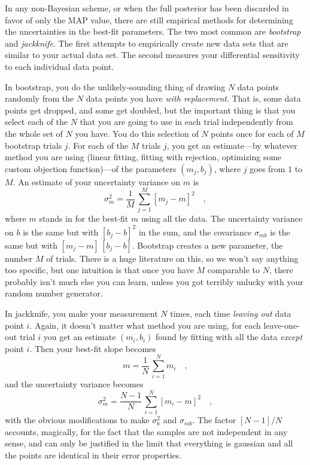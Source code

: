 \documentclass[12pt]{article}
\begin{document}
In any non-Bayesian scheme, or when the full posterior has been
discarded in favor of only the MAP value, there are still empirical
methods for determining the uncertainties in the best-fit parameters.
The two most common are \emph{bootstrap} and \emph{jackknife}.  The
first attempts to empirically create new data sets that are similar to
your actual data set.  The second measures your differential
sensitivity to each individual data point.

In bootstrap, you do the unlikely-sounding thing of drawing $N$ data
points randomly from the $N$ data points you have \emph{with
  replacement}.  That is, some data points get dropped, and some get
doubled, but the important thing is that you select each of the $N$
that you are going to use in each trial independently from the whole
set of $N$ you have.  You do this selection of $N$ points once for
each of $M$ bootstrap trials $j$.  For each of the $M$ trials $j$, you
get an estimate---by whatever method you are using (linear fitting,
fitting with rejection, optimizing some custom objection
function)---of the parameters $(m_j,b_j)$, where $j$ goes from $1$ to
$M$.  An estimate of your uncertainty variance on $m$ is
\begin{equation}
\sigma_m^2 = \frac{1}{M}\,\sum_{j=1}^M [m_j-m]^2 \quad ,
\end{equation}
where $m$ stands in for the best-fit $m$ using all the data.  The
uncertainty variance on $b$ is the same but with $[b_j-b]^2$ in the
sum, and the covariance $\sigma_{mb}$ is the same but with
$[m_j-m]\,[b_j-b]$.  Bootstrap creates a new parameter, the number $M$
of trials.  There is a huge literature on this, so we won't say
anything too specific, but one intuition is that once you have $M$
comparable to $N$, there probably isn't much else you can learn,
unless you got terribly unlucky with your random number generator.

In jackknife, you make your measurement $N$ times, each time
\emph{leaving out} data point $i$.  Again, it doesn't matter what
method you are using, for each leave-one-out trial $i$ you get an
estimate $(m_i,b_i)$ found by fitting with all the data \emph{except}
point $i$.  Then your best-fit slope becomes
\begin{equation}
m = \frac{1}{N}\,\sum_{i=1}^N m_i \quad ,
\end{equation}
and the uncertainty variance becomes
\begin{equation}
\sigma_m^2 = \frac{N-1}{N}\,\sum_{i=1}^N [m_i-m]^2 \quad ,
\end{equation}
with the obvious modifications to make $\sigma_b^2$ and
$\sigma_{mb}$.  The factor $[N-1]/N$ accounts, magically, for the
fact that the samples are not independent in any sense, and can only
be justified in the limit that everything is gaussian and all the
points are identical in their error properties.
\end{document}
